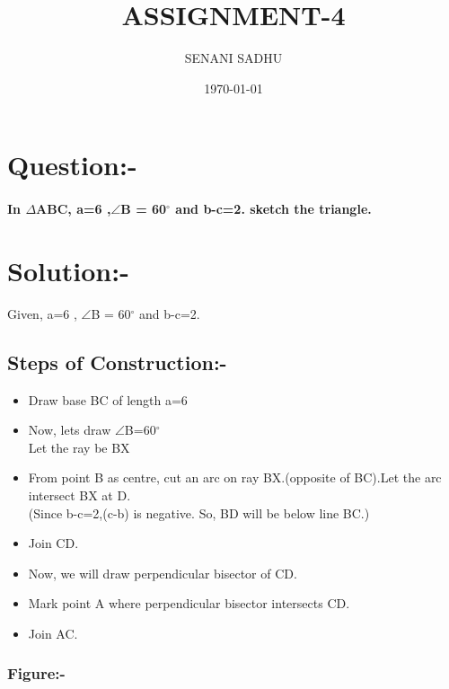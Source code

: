 \documentclass[a4paper,12pt]{article}
\title{ASSIGNMENT-4}
\author{SENANI SADHU}
\date{\today}
\begin{document}
	\maketitle
	\section{Question:-}
	\paragraph{In $\Delta$ABC, a=6 ,$\angle$B = 60$^{\circ}$ and b-c=2. sketch the triangle.}
	\section{Solution:-}
	Given, a=6 , $\angle$B = 60$^{\circ}$ and b-c=2.\\
	\subsection{Steps of Construction:-}
	\begin{itemize}
		\item Draw base BC of length a=6
		\item Now, lets draw $\angle$B=60$^{\circ}$\\
		Let the ray be BX
		\item From point B as centre,  cut an arc on ray BX.(opposite of BC).Let the arc intersect  BX at D.\\ 
		(Since b-c=2,(c-b) is negative. So, BD will be below line BC.)
		\item Join CD.
		\item  Now, we will draw  perpendicular  bisector of CD.
		\item Mark point A where perpendicular bisector  intersects CD.
		\item  Join AC.
	\end{itemize}
	\subsubsection{Figure:-}
	\begin{center}
	\end{center}
\end{document}
